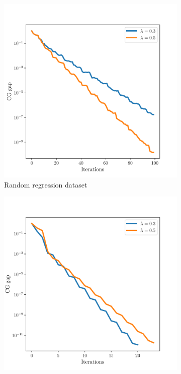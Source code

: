 \documentclass[10pt, twocolumn, reqno, a4paper,oneside]{amsart}
\numberwithin{equation}{section}
\numberwithin{theorem}{section}
\numberwithin{figure}{section}
\numberwithin{table}{section}
\numberwithin{theorem}{section}
\numberwithin{equation}{section}
\begin{document}
\begin{figure}[!tb]
	\centering
	\begin{subfigure}[b]{0.42\textwidth}
		\centering
		\includegraphics[width=\textwidth]{figs/fw_lasso_random_plot_different_lambda.pdf}
		\caption{Random regression dataset}
		\label{fig:randomds}
	\end{subfigure}
	\begin{subfigure}[b]{0.42\textwidth}
		\centering
		\qquad \qquad \qquad
		\includegraphics[width=\textwidth]{figs/fw_lasso_housing_plot_different_lambda.pdf}

\end{subfigure}
\end{figure}
\end{document}
